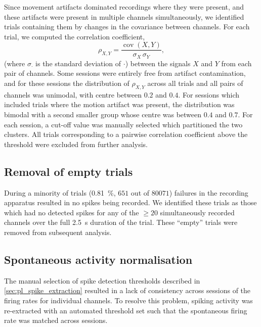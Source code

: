 Since movement artifacts dominated recordings where they were present, and these artifacts were present in multiple channels simultaneously, we identified trials containing them by changes in the covariance between channels.
For each trial, we computed the correlation coefficient,
\begin{equation}
\rho_{X,Y} = \frac{\operatorname{cov}(X,Y)}{\sigma_X \, \sigma_Y}
,\end{equation}
(where $\sigma_\cdot$ is the standard deviation of $\cdot$) between the signals $X$ and $Y$ from each pair of channels.
Some sessions were entirely free from artifact contamination, and for these sessions the distribution of $\rho_{X,Y}$ across all trials and all pairs of channels was unimodal, with centre between $0.2$ and $0.4$.
For sessions which included trials where the motion artifact was present, the distribution was bimodal with a second smaller group whose centre was between $0.4$ and $0.7$.
For each session, a cut-off value was manually selected which partitioned the two clusters.
All trials corresponding to a pairwise correlation coefficient above the threshold were excluded from further analysis.



\subsection{Removal of empty trials}

During a minority of trials (\SI{0.81}{\percent}, $651$ out of $80071$) failures in the recording apparatus resulted in no spikes being recorded.
We identified these trials as those which had no detected spikes for any of the ${\ge}20$ simultaneously recorded channels over the full \SI{2.5}{\second} duration of the trial.
These ``empty'' trials were removed from subsequent analysis.


\subsection{Spontaneous activity normalisation}
\label{sec:pl_san}

The manual selection of spike detection thresholds described in \autoref{sec:pl_spike_extraction} resulted in a lack of consistency across sessions of the firing rates for individual channels.
To resolve this problem, spiking activity was re-extracted with an automated threshold set such that the spontaneous firing rate was matched across sessions.

